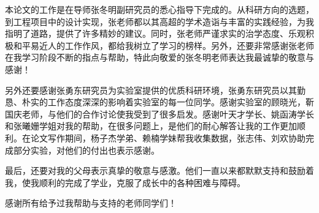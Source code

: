 
\begin{thanks}

本论文的工作是在导师张冬明副研究员的悉心指导下完成的。从科研方向的选题，到工程项目中的设计实现，张老师都以其高超的学术造诣与丰富的实践经验，为我指明了道路，提供了许多精妙的建议。同时，张老师严谨求实的治学态度、乐观积极和平易近人的工作作风，都给我树立了学习的榜样。另外，还要非常感谢张老师在我学习阶段不断的指点与帮助，特此向敬爱的张冬明老师表达我最诚挚的敬意与感谢！

另外还要感谢张勇东研究员为实验室提供的优质科研环境，张勇东研究员以其勤恳、朴实的工作态度深深的影响着实验室的每一位同学。感谢实验室的顾晓光，靳国庆老师，与他们的合作讨论使我受到了很多启发。感谢叶天才学长、姚函涛学长和张曦姗学姐对我的帮助，在很多问题上，是他们的耐心解答让我的工作更加顺利。在论文写作期间，杨子杰学弟、赖楠学妹帮我收集数据，张志伟、刘欢协助完成部分实验，对他们的付出也表示感谢。

最后，还要对我的父母表示真挚的敬意与感激。他们一直以来都默默支持和鼓励着我，使我顺利的完成了学业，克服了成长中的各种困难与障碍。

感谢所有给予过我帮助与支持的老师同学们！

\end{thanks}
